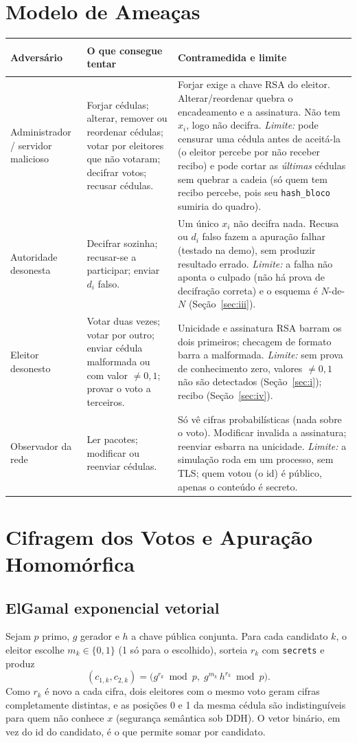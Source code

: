 \documentclass[11pt,a4paper]{article}
\begin{document}
\section{Modelo de Ameaças}
\begin{xltabular}{\textwidth}{@{}>{\bfseries\raggedright\arraybackslash}p{2.9cm}YY@{}}
\toprule
Adversário & O que consegue tentar & Contramedida e limite\\
\midrule
Administrador / servidor malicioso &
Forjar cédulas; alterar, remover ou reordenar cédulas; votar por eleitores que não votaram; decifrar votos; recusar cédulas. &
Forjar exige a chave RSA do eleitor. Alterar/reordenar quebra o encadeamento e a assinatura. Não tem $x_i$, logo não decifra. \emph{Limite:} pode censurar uma cédula antes de aceitá-la (o eleitor percebe por não receber recibo) e pode cortar as \emph{últimas} cédulas sem quebrar a cadeia (só quem tem recibo percebe, pois seu \texttt{hash\_bloco} sumiria do quadro).\\
Autoridade desonesta &
Decifrar sozinha; recusar-se a participar; enviar $d_i$ falso. &
Um único $x_i$ não decifra nada. Recusa ou $d_i$ falso fazem a apuração falhar (testado na demo), sem produzir resultado errado. \emph{Limite:} a falha não aponta o culpado (não há prova de decifração correta) e o esquema é $N$-de-$N$ (Seção~\ref{sec:iii}).\\
Eleitor desonesto &
Votar duas vezes; votar por outro; enviar cédula malformada ou com valor $\ne 0,1$; provar o voto a terceiros. &
Unicidade e assinatura RSA barram os dois primeiros; checagem de formato barra a malformada. \emph{Limite:} sem prova de conhecimento zero, valores $\ne0,1$ não são detectados (Seção~\ref{sec:i}); recibo (Seção~\ref{sec:iv}).\\
Observador da rede &
Ler pacotes; modificar ou reenviar cédulas. &
Só vê cifras probabilísticas (nada sobre o voto). Modificar invalida a assinatura; reenviar esbarra na unicidade. \emph{Limite:} a simulação roda em um processo, sem TLS; quem votou (o id) é público, apenas o conteúdo é secreto.\\
\bottomrule
\end{xltabular}

\section{Cifragem dos Votos e Apuração Homomórfica}
\subsection{ElGamal exponencial vetorial}
Sejam $p$ primo, $g$ gerador e $h$ a chave pública conjunta. Para cada candidato $k$, o eleitor escolhe $m_k\in\{0,1\}$ (1 só para o escolhido), sorteia $r_k$ com \texttt{secrets} e produz
\[
(c_{1,k},c_{2,k})=\bigl(g^{r_k}\bmod p,\; g^{m_k}\,h^{r_k}\bmod p\bigr).
\]
Como $r_k$ é novo a cada cifra, dois eleitores com o mesmo voto geram cifras completamente distintas, e as posições 0 e 1 da mesma cédula são indistinguíveis para quem não conhece $x$ (segurança semântica sob DDH). O vetor binário, em vez do id do candidato, é o que permite somar por candidato.
\end{document}
